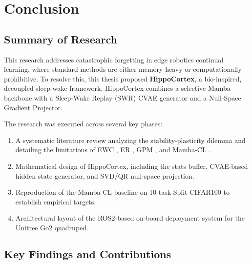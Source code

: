 

\chapter{Conclusion}
\label{chap:conclusion}

\section{Summary of Research}
\label{sec:summary}

This research addresses catastrophic forgetting in edge robotics continual learning, where standard methods are either memory-heavy or computationally prohibitive. To resolve this, this thesis proposed \textbf{HippoCortex}, a bio-inspired, decoupled sleep-wake framework. HippoCortex combines a selective Mamba backbone \cite{guMambaLinearTimeSequence2024} with a Sleep-Wake Replay (SWR) CVAE generator and a Null-Space Gradient Projector.

The research was executed across several key phases:
\begin{enumerate}
    \item A systematic literature review analyzing the stability-plasticity dilemma and detailing the limitations of EWC \cite{kirkpatrickOvercomingCatastrophicForgetting2017}, ER \cite{riemer2019learning}, GPM \cite{sahaGradientProjectionMemory2021}, and Mamba-CL \cite{chengMambaCLOptimizingSelective2025}.
    \item Mathematical design of HippoCortex, including the stats buffer, CVAE-based hidden state generator, and SVD/QR null-space projection.
    \item Reproduction of the Mamba-CL \cite{chengMambaCLOptimizingSelective2025} baseline on 10-task Split-CIFAR100 \cite{venThreeScenariosContinual2019} to establish empirical targets.
    \item Architectural layout of the ROS2-based on-board deployment system for the Unitree Go2 quadruped.
\end{enumerate}

\section{Key Findings and Contributions}
\label{sec:contributions}

